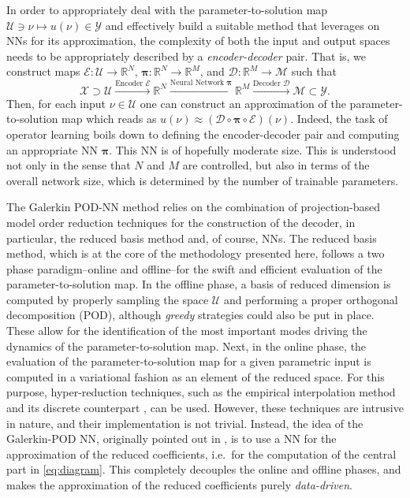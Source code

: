 In order to appropriately deal with the parameter-to-solution map
$\mathcal{U} \ni \nu \mapsto u(\nu) \in \mathcal{Y}$ and effectively build a suitable method that leverages on NNs
for its approximation, the complexity of both the input
and output spaces needs to be appropriately described by a 
\emph{encoder-decoder} pair.
That is, we construct maps $\mathscr{E}: \mathcal{U} \rightarrow \mathbb{R}^N $, $\boldsymbol{\pi}: \mathbb{R}^N \rightarrow\mathbb{R}^M $, and
$\mathscr{D}: \mathbb{R}^M \rightarrow \mathcal{M}$ such that
\begin{equation}\label{eq:diagram}
	\mathcal{X}
	\supset
	\mathcal{U}
	\xrightarrow{\text{Encoder }\mathscr{E} }	
	\mathbb{R}^N
	\xrightarrow{\text{Neural Network }\boldsymbol{\pi}}	
	\mathbb{R}^M
	\xrightarrow{\text{Decoder }\mathscr{D}}
	\mathcal{M}
	\subset
	\mathcal{Y}.
\end{equation}
Then, for each input $\nu \in \mathcal{U}$ one can construct
an approximation of the parameter-to-solution map  which reads
as $u(\nu) \approx \left(\mathscr{D} \circ \boldsymbol{\pi} \circ \mathscr{E}\right) (\nu)$.
Indeed, the task of operator learning boils down to defining the encoder-decoder pair and
computing an appropriate NN $\boldsymbol{\pi}$. This NN is of hopefully moderate size.
This is understood not only in the sense that $N$ and $M$ are controlled, but also in terms of the overall network size, which is determined by the number of trainable parameters.



The Galerkin POD-NN method relies on the combination
of projection-based model order reduction techniques
for the construction of the decoder, in particular, the reduced basis method \cite{hesthaven2016certified,QMNMOR2016} and, of course, NNs.
The reduced basis method, which is at the core of the methodology presented here, follows a two phase paradigm--online
and offline--for the swift and efficient evaluation of the
parameter-to-solution map.
In the offline phase, a basis of
reduced dimension is computed by properly sampling the space $\mathcal{U}$ and performing
a proper orthogonal decomposition (POD), although \emph{greedy} strategies could also be put in place. 
These allow for the identification of the most important modes driving the dynamics of the parameter-to-solution map.
Next, in the online phase, the evaluation of the parameter-to-solution map for a given parametric input is computed in a variational fashion as an element of the reduced space. For this purpose,
hyper-reduction techniques, such as the empirical interpolation method \cite{barrault2004empirical} and its discrete counterpart
\cite{chaturantabut2010nonlinear}, can be used. However, these techniques are intrusive in nature, and their implementation is not trivial. Instead, the idea of the Galerkin-POD NN, originally pointed out in \cite{HU18}, is to use a NN for the approximation of the reduced coefficients,
i.e.~for the computation of the central part in \cref{eq:diagram}. This completely decouples the online and offline phases, and makes the approximation of the reduced coefficients purely \emph{data-driven}.

